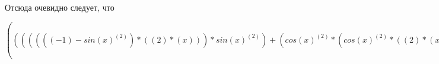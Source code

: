 \documentclass[12pt,a4paper,fleqn]{article}
\theoremstyle{definition}
\begin{document}
Отсюда очевидно следует, что

$((((((( -1 ) - sin{( x )}^{( 2 )}) * (( 2 ) * ( x ))) * sin{( x )}^{( 2 )}) + (cos{( x )}^{( 2 )} * (cos{( x )}^{( 2 )} * (( 2 ) * ( x ))))) * \log_{( x )}{(( 3.5 ) * ( x ))}) + ((cos{( x )}^{( 2 )} * sin{( x )}^{( 2 )}) * \frac{(\frac{(\log_{( 2.71828 )}{( x )} * ( 3.5 ))}{(( 3.5 ) * ( x ))}
 - \frac{\log_{( 2.71828 )}{(( 3.5 ) * ( x ))}}{( x )}
)}{(\log_{( 2.71828 )}{( x )} * \log_{( 2.71828 )}{( x )})}
)) = ((((((( -1 ) - sin{( x )}^{( 2 )}) * (( 2 ) * ( x ))) * sin{( x )}^{( 2 )}) + (cos{( x )}^{( 2 )} * (cos{( x )}^{( 2 )} * (( 2 ) * ( x ))))) * \log_{( x )}{(( 3.5 ) * ( x ))}) + ((cos{( x )}^{( 2 )} * sin{( x )}^{( 2 )}) * \frac{(\frac{(\log_{( 2.71828 )}{( x )} * ( 3.5 ))}{(( 3.5 ) * ( x ))}
 - \frac{\log_{( 2.71828 )}{(( 3.5 ) * ( x ))}}{( x )}
)}{(\log_{( 2.71828 )}{( x )} * \log_{( 2.71828 )}{( x )})}
))$
\end{document}
